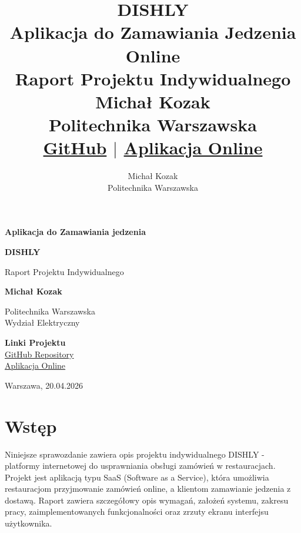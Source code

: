 \documentclass[12pt,a4paper,utf-8]{article}
\title{%
    \textbf{DISHLY} \\
    \large Aplikacja do Zamawiania Jedzenia Online \\
    \large Raport Projektu Indywidualnego \\
    \vspace{0.3cm}
    \normalsize Michał Kozak \\
    \small Politechnika Warszawska \\
    \vspace{0.5cm}
    \tiny \href{https://github.com/podlaskialgorytm3/dishly}{GitHub} $|$ \href{https://dishly-ochre.vercel.app/}{Aplikacja Online}
}
\author{Michał Kozak \\ Politechnika Warszawska}
\date{}
\begin{document}
\begin{titlepage}
    \centering
    \vspace*{2cm}

    {\Huge \textbf{Aplikacja do Zamawiania jedzenia}}
    
    \vspace{0.8cm}
    
    {\Large \textbf{DISHLY}}
    
    \vspace{0.5cm}
    
    \vspace{2cm}
    
    {\Large Raport Projektu Indywidualnego}
    
    \vspace{3cm}
    
    {\Large \textbf{Michał Kozak}}
    
    \vspace{2cm}
    
    {\large Politechnika Warszawska} \\
    {\normalsize Wydział Elektryczny}
    
    \vspace{3cm}
    
    {\normalsize \textbf{Linki Projektu}} \\
    \href{https://github.com/podlaskialgorytm3/dishly}{GitHub Repository} \\
    \href{https://dishly-ochre.vercel.app/}{Aplikacja Online}
    
    \vfill
    
    {\normalsize Warszawa, 20.04.2026}
    
\end{titlepage}

\cleardoublepage

\tableofcontents
\newpage

\section{Wstęp}

Niniejsze sprawozdanie zawiera opis projektu indywidualnego DISHLY - platformy internetowej do usprawniania obsługi zamówień w restauracjach. Projekt jest aplikacją typu SaaS (Software as a Service), która umożliwia restauracjom przyjmowanie zamówień online, a klientom zamawianie jedzenia z dostawą. Raport zawiera szczegółowy opis wymagań, założeń systemu, zakresu pracy, zaimplementowanych funkcjonalności oraz zrzuty ekranu interfejsu użytkownika.
\end{document}
